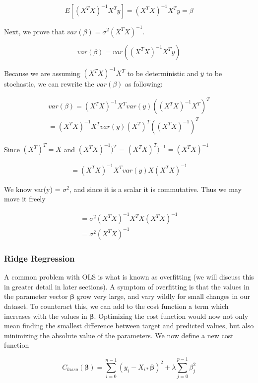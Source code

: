 \documentclass[twocolumn,10pt,cleanfoot]{asme2ej}
\begin{document}
\begin{equation}
E[(X^{T}X)^{-1}X^{T}y] = (X^{T}X)^{-1}X^{T}y = \beta
\end{equation}

Next, we prove that $var(\beta) = \sigma^{2}(X^{T}X)^{-1}$.

$$var(\beta) = var((X^{T}X)^{-1}X^{T}y)$$

Because we are assuming $(X^{T}X)^{-1}X^{T}$ to be deterministic and $y$ to be stochastic, we can rewrite the $var(\beta)$ as following:

\begin{gather}
var(\beta) = (X^{T}X)^{-1}X^{T}var(y)((X^{T}X)^{-1}X^{T})^{T} \\
= (X^{T}X)^{-1}X^{T}var(y)(X^{T})^{T}((X^{T}X)^{-1})^{T}
\end{gather}

Since $(X^{T})^{T} = X$ and $(X^{T}X)^{-1})^{T}$ = $(X^{T}X)^{T})^{-1} = (X^{T}X)^{-1}$

\begin{gather}
= (X^{T}X)^{-1}X^{T}var(y)X(X^{T}X)^{-1}
\end{gather}

We know var(y) = $\sigma^{2}$, and since it is a scalar it is commutative. Thus we may move it freely

\begin{gather}
= \sigma^{2}(X^{T}X)^{-1}X^{T}X(X^{T}X)^{-1} \\
= \sigma^{2}(X^{T}X)^{-1}
\end{gather}

\subsubsection{Ridge Regression}

A common problem with OLS is what is known as overfitting (we will discuss this in greater detail in later sections). A symptom of overfitting is that the values in the parameter vector $\bm{\beta}$ grow very large, and vary wildly for small changes in our dataset. To counteract this, we can add to the cost function a term which increases with the values in $\bm{\beta}$. Optimizing the cost function would now not only mean finding the smallest difference between target and predicted values, but also minimizing the absolute value of the parameters. We now define a new cost function

\begin{equation}
	C_{lasso}(\bm{\beta}) = \sum_{i=0}^{n-1}(y_i-X_{i*}\bm{\beta})^2 + \lambda \sum_{j=0}^{p-1} \beta_j^2
\end{equation}
\end{document}
